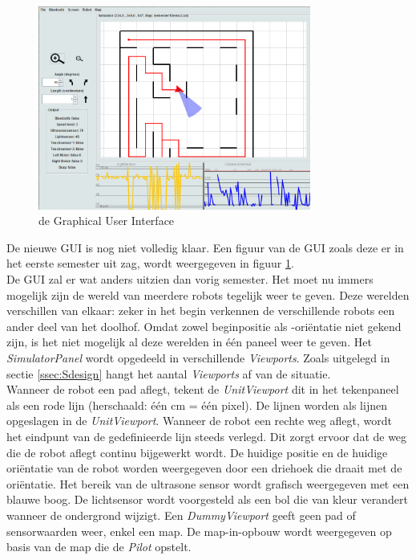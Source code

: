 \documentclass[tt2]{penoverslag}
\begin{document}
\begin{figure}[h]
\centering
	\includegraphics[width=0.8\textwidth]{GUI}
\caption{de Graphical User Interface}
\label{fig:GUI}
\end{figure}

De nieuwe GUI is nog niet volledig klaar. Een figuur van de GUI zoals deze er in het eerste semester uit zag, wordt weergegeven in figuur \ref{fig:GUI}.\\

De GUI zal er wat anders uitzien dan vorig semester. Het moet nu immers mogelijk zijn de wereld van meerdere robots tegelijk weer te geven. Deze werelden verschillen van elkaar: zeker in het begin verkennen de verschillende robots een ander deel van het doolhof. Omdat zowel beginpositie als -ori\"entatie niet gekend zijn, is het niet mogelijk al deze werelden in \'e\'en paneel weer te geven. Het \textit{SimulatorPanel} wordt opgedeeld in verschillende \textit{Viewports}. Zoals uitgelegd in sectie \ref{ssec:Sdesign} hangt het aantal \textit{Viewports} af van de situatie.\\

Wanneer de robot een pad aflegt, tekent de \textit{UnitViewport} dit in het tekenpaneel als een rode lijn (herschaald: \'e\'en cm = \'e\'en pixel). De lijnen worden als lijnen opgeslagen in de \textit{UnitViewport}. Wanneer de robot een rechte weg aflegt, wordt het eindpunt van de gedefinieerde lijn steeds verlegd. Dit zorgt ervoor dat de weg die de robot aflegt continu bijgewerkt wordt. De huidige positie en de huidige ori\"entatie van de robot worden weergegeven door een driehoek die draait met de ori\"entatie. Het bereik van de ultrasone sensor wordt grafisch weergegeven met een blauwe boog. De lichtsensor wordt voorgesteld als een bol die van kleur verandert wanneer de ondergrond wijzigt. 
Een \textit{DummyViewport} geeft geen pad of sensorwaarden weer, enkel een map. De map-in-opbouw wordt weergegeven op basis van de map die de \textit{Pilot} opstelt.\\
\end{document}
